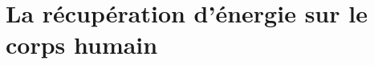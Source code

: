 

\lhead[\fancyplain{}{\leftmark}]%
      {\fancyplain{}{}} %
\chead[\fancyplain{}{}]%
      {\fancyplain{}{}}
\rhead[\fancyplain{}{}]%
      {\fancyplain{}{\rightmark}}%
\lfoot[\fancyplain{}{}]%
      {\fancyplain{}{}}
\cfoot[\fancyplain{}{\thepage}]%
      {\fancyplain{}{\thepage}} %
\rfoot[\fancyplain{}{}]%
     {\fancyplain{}{\scriptsize}}

\def \hfillx {\hspace*{ -\textwidth} \hfill} %

\chapter{La récupération d'énergie sur le corps humain}
\label{ch:1_La recuperation d'energie sur le corps humain}

\minitoc
\newpage

